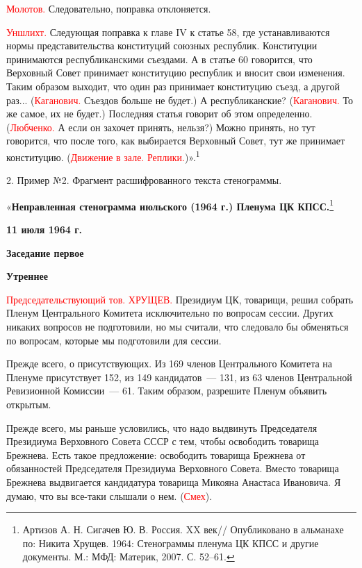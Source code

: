 \documentclass{kursa4}
\begin{document}
{    \textcolor{red}{Молотов.}{
    Следовательно, поправка отклоняется.}

    \textcolor{red}{Уншлихт.}{
    Следующая поправка к главе IV к статье 58, где устанавливаются нормы
    представительства конституций союзных республик. Конституции
    принимаются республиканскими съездами. А в статье 60 говорится, что
    Верховный Совет принимает конституцию республик и вносит свои
    изменения. Таким образом выходит, что один раз принимает конституцию
    съезд, а другой раз...
    (}\textcolor{red}{Каганович.}{
    Съездов больше не будет.) А республиканские?
    (}\textcolor{red}{Каганович.}{
    То же самое, их не будет.) Последняя статья говорит об этом
    определенно.
    (}\textcolor{red}{Любченко.}{
    А если он захочет принять, нельзя?) Можно принять, но тут говорится,
    что после того, как выбирается Верховный Совет, тут же принимает
    конституцию.
    (}\textcolor{red}{Движение в зале.
    Реплики.}{)».}{\textsuperscript{1}}


    \bigskip

    2. Пример №2. Фрагмент расшифрованного текста стенограммы.


    \bigskip

    «\textbf{{Неправленная стенограмма июльского (1964 г.)
    Пленума ЦК КПСС.}}\footnote{ Артизов А. Н. Сигачев Ю. В. Россия. XX
    век// Опубликовано в альманахе по: Никита Хрущев. 1964: Стенограммы
    пленума ЦК КПСС и другие документы. М.: МФД: Материк, 2007. С. 52–61.}

    \textbf{{11 июля 1964 г.}}

    \textbf{{Заседание первое}}

    \textbf{{Утреннее}}

    \textcolor{red}{Председательствующий тов.
    ХРУЩЕВ.}{ Президиум ЦК, товарищи, решил собрать Пленум
    Центрального Комитета исключительно по вопросам сессии. Других никаких
    вопросов не }{подготовили, но мы считали, что
    следовало бы обменяться по вопросам, которые мы подготовили для
    сессии.}

    {Прежде всего, о присутствующих. Из 169 членов
    Центрального Комитета на Пленуме присутствует 152, из 149 кандидатов~---
    131, из 63 членов Центральной Ревизионной Комиссии~--- 61. Таким образом,
    разрешите Пленум объявить открытым.}

    {Прежде всего, мы раньше условились, что надо выдвинуть
    Председателя Президиума Верховного Совета СССР с тем, чтобы освободить
    товарища Брежнева. Есть такое предложение: освободить товарища Брежнева
    от обязанностей Председателя Президиума Верховного Совета. Вместо
    товарища Брежнева выдвигается кандидатура товарища Микояна Анастаса
    Ивановича. Я думаю, что вы все-таки слышали о нем.
    (}\textcolor{red}{Смех}{).}

}
\end{document}
